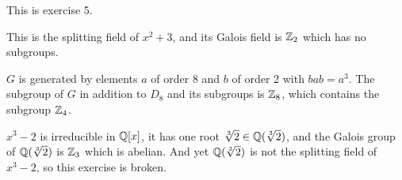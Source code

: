 \documentclass[11pt, oneside]{article}   	%
\begin{document}
\item This is exercise 5.
\item This is the splitting field of $x^2 + 3$, and its Galois field is $\mathbb{Z}_2$ which has no subgroups.
\ee
\item $G$ is generated by elements $a$ of order 8 and $b$ of order 2 with $bab = a^3$. The subgroup of $G$ in addition to $D_8$ and its subgroups is $\mathbb{Z}_8$, which contains the subgroup $\mathbb{Z}_4$. 
\item $x^3 - 2$ is irreducible in $\mathbb{Q}[x]$, it has one root $\sqrt[3]{2} \in \mathbb{Q}(\sqrt[3]{2})$, and the Galois group of $\mathbb{Q}(\sqrt[3]{2})$ is $\mathbb{Z}_3$ which is abelian. And yet $\mathbb{Q}(\sqrt[3]{2})$ is not the splitting field of $x^3-2$, so this exercise is broken.
\ee
\end{document}
